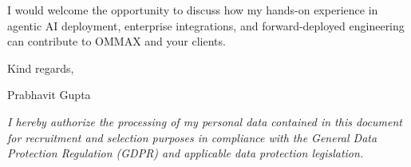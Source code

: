 \documentclass[10.5pt,a4paper]{article}
\begin{document}
I would welcome the opportunity to discuss how my hands-on experience in agentic AI deployment, enterprise integrations, and forward-deployed engineering can contribute to OMMAX and your clients.

Kind regards,

Prabhavit Gupta

\vspace{0.4em}
{\footnotesize \textit{I hereby authorize the processing of my personal data contained in this document for recruitment and selection purposes in compliance with the General Data Protection Regulation (GDPR) and applicable data protection legislation.}\par}
\end{document}
